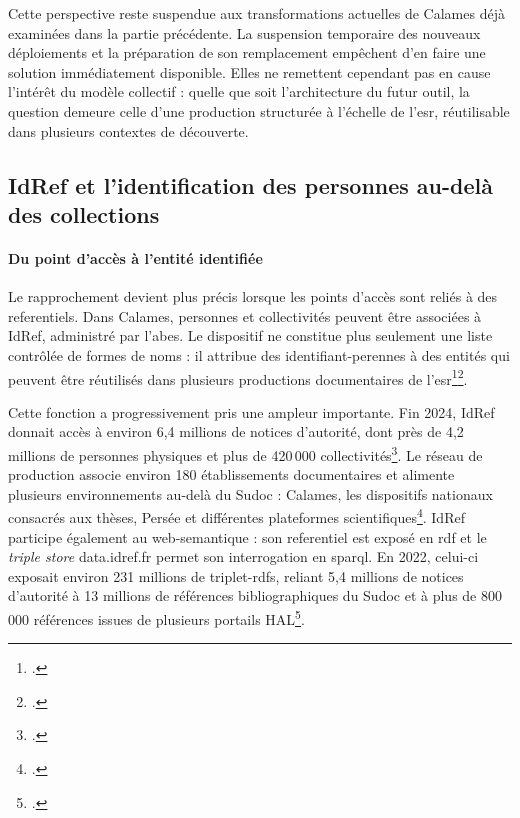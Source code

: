 Cette perspective reste suspendue aux transformations actuelles de Calames déjà examinées dans la partie précédente. La suspension temporaire des nouveaux déploiements et la préparation de son remplacement empêchent d'en faire une solution immédiatement disponible. Elles ne remettent cependant pas en cause l'intérêt du modèle collectif : quelle que soit l'architecture du futur outil, la question demeure celle d'une production structurée à l'échelle de l'\gls{esr}, réutilisable dans plusieurs contextes de découverte.


\subsection{IdRef et l'identification des personnes au-delà des collections}
\label{sec:idref}

\paragraph{Du point d'accès à l'entité identifiée}

Le rapprochement devient plus précis lorsque les points d'accès sont reliés à des \glspl{referentiel}. Dans Calames, personnes et collectivités peuvent être associées à IdRef, administré par l'\Gls{abes}. Le dispositif ne constitue plus seulement une liste contrôlée de formes de noms : il attribue des \glspl{identifiant-perenne} à des entités qui peuvent être réutilisés dans plusieurs productions documentaires de l'\gls{esr}\footcite{MistralNicolas2017}\footcite{MistralIdRef2024}.

Cette fonction a progressivement pris une ampleur importante. Fin 2024, IdRef donnait accès à environ 6,4 millions de notices d'autorité, dont près de 4,2 millions de personnes physiques et plus de 420\,000 collectivités\footcite{AbesRapportActivite2024}. Le réseau de production associe environ 180 établissements documentaires et alimente plusieurs environnements au-delà du Sudoc : Calames, les dispositifs nationaux consacrés aux thèses, Persée et différentes plateformes scientifiques\footcite{AbesReseauAutorites2026}. IdRef participe également au \gls{web-semantique} : son \gls{referentiel} est exposé en \gls{rdf} et le \emph{triple store} data.idref.fr permet son interrogation en \gls{sparql}. En 2022, celui-ci exposait environ 231 millions de \glspl{triplet-rdf}, reliant 5,4 millions de notices d'autorité à 13 millions de références bibliographiques du Sudoc et à plus de 800\,000 références issues de plusieurs portails HAL\footcite{AbesDataIdRef}.

